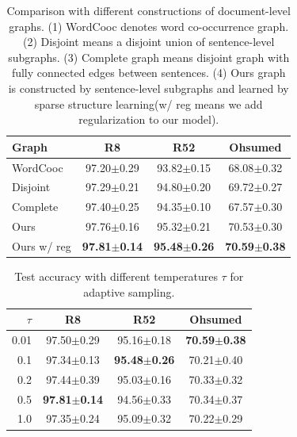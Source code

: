 \documentclass[letterpaper]{article} %
\begin{document}
\begin{table}[t]
\centering
\begin{tabular}{l|ccc}
\toprule
\textbf{Graph} & \textbf{R8} & \textbf{R52} & \textbf{Ohsumed} \\ \midrule
WordCooc & 97.20$\pm$0.29 & 93.82$\pm$0.15 & 68.08$\pm$0.32 \\
Disjoint & 97.29$\pm$0.21 & 94.80$\pm$0.20 & 69.72$\pm$0.27 \\
Complete & 97.40$\pm$0.25 & 94.35$\pm$0.10 & 67.57$\pm$0.30 \\
\midrule
Ours      & 97.76$\pm$0.16 & 95.32$\pm$0.21 & 70.53$\pm$0.30\\
Ours w/ reg & \textbf{97.81$\pm$0.14} & \textbf{95.48$\pm$0.26} & \textbf{70.59$\pm$0.38}\\
\bottomrule
\end{tabular}
\caption{Comparison with different constructions of document-level graphs. (1) WordCooc denotes word co-occurrence graph. (2) Disjoint means a disjoint union of sentence-level subgraphs. (3) Complete graph means disjoint graph with fully connected edges between sentences. (4) Ours graph is constructed by sentence-level subgraphs and learned by sparse structure learning(w/ reg means we add regularization to our model). }
\label{table3}
\end{table}



\begin{table}[t]
\centering
\begin{tabular}{r|ccc}
\toprule
\textbf{$\tau$} & \textbf{R8} & \textbf{R52} & \textbf{Ohsumed} \\ \midrule
0.01 & 97.50$\pm$0.29 & 95.16$\pm$0.18 & \textbf{70.59$\pm$0.38} \\
0.1  & 97.34$\pm$0.13 & \textbf{95.48$\pm$0.26} & 70.21$\pm$0.40 \\
0.2  & 97.44$\pm$0.39 & 95.03$\pm$0.16 & 70.33$\pm$0.32  \\
0.5  &\textbf{97.81$\pm$0.14} & 94.56$\pm$0.33 & 70.34$\pm$0.37 \\
1.0  & 97.35$\pm$0.24 & 95.09$\pm$0.32 & 70.22$\pm$0.29 \\
\bottomrule
\end{tabular}
\caption{Test accuracy with different temperatures $\tau$ for adaptive sampling.}
\label{table4}
\end{table}
\end{document}
